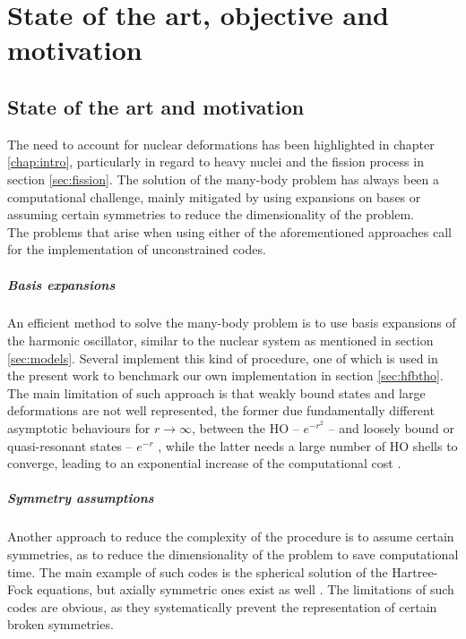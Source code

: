 \chapter{State of the art, objective and motivation}
\label{chap:methods}
\section{State of the art and motivation}
The need to account for nuclear deformations has been highlighted in chapter \ref{chap:intro}, particularly in regard to heavy nuclei and the fission process in section \ref{sec:fission}. The solution of the many-body problem has always been a computational challenge, mainly mitigated by using expansions on bases or assuming certain symmetries to reduce the dimensionality of the problem.
\\The problems that arise when using either of the aforementioned approaches call for the implementation of unconstrained codes.
\paragraph{Basis expansions} 
An efficient method to solve the many-body problem is to use basis expansions of the harmonic oscillator, similar to the nuclear system as mentioned in section \ref{sec:models}. Several implement this kind of procedure, one of which is used in the present work to benchmark our own implementation in section \ref{sec:hfbtho}. The main limitation of such approach is that weakly bound states and large deformations are not well represented, the former due fundamentally different asymptotic behaviours for $r\to \infty$, between the HO -- $e^{-r^2}$ -- and loosely bound or quasi-resonant states -- $e^{-r}$ \cite{Stoitsov2003_PRCC68_054312,Dobaczewski1996_PRCC53_2809}, while the latter needs a large number of HO shells to converge, leading to an exponential increase of the computational cost \cite{Marevic2022_CPC}.
\paragraph{Symmetry assumptions} 
Another approach to reduce the complexity of the procedure is to assume certain symmetries, as to reduce the dimensionality of the problem to save computational time. The main example of such codes is the spherical solution \cite{VauhBrinkOriginal,hfbcsqrpa} of the Hartree-Fock equations, but axially symmetric ones exist as well \cite{Pei2008_HFBAX}. The limitations of such codes are obvious, as they systematically prevent the representation of certain broken symmetries.
